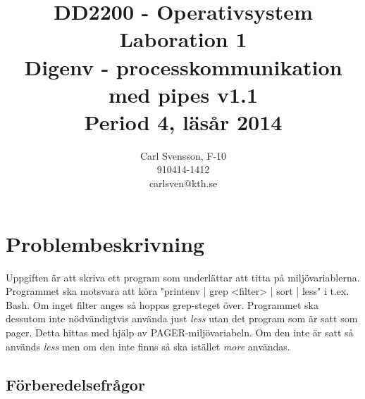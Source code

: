 \documentclass[10pt,a4paper]{article}
\title{DD2200 - Operativsystem \\ Laboration 1 \\ Digenv - processkommunikation med pipes  v1.1 \\ Period 4, läsår 2014}
\author{Carl Svensson, F-10 \\ 910414-1412 \\ carlsven@kth.se}
\date{}
\begin{document}
\maketitle
\tableofcontents
\clearpage


\section{Problembeskrivning}

Uppgiften är att skriva ett program som underlättar att titta på miljövariablerna. Programmet ska motsvara att köra "printenv | grep <filter> | sort | less" i t.ex. Bash. Om inget filter anges så hoppas grep-steget över.
Programmet ska dessutom inte nödvändigtvis använda just \emph{less} utan det program som är satt som pager. Detta hittas med hjälp av PAGER-miljövariabeln. Om den inte är satt så används \emph{less} men om den inte finns så ska istället \emph{more} användas.

\subsection{Förberedelsefrågor}
\end{document}
